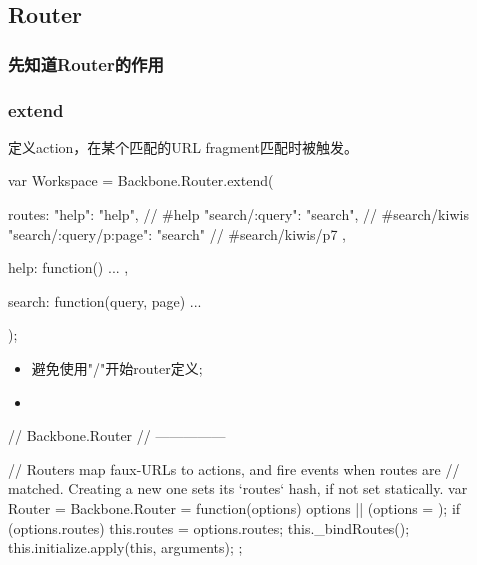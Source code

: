


\subsection{Router}

\subsubsection{先知道Router的作用}

\subsubsection{extend}

定义action，在某个匹配的URL fragment匹配时被触发。

\begin{JavaScript}
var Workspace = Backbone.Router.extend({

  routes: {
    "help":                 "help",    // #help
    "search/:query":        "search",  // #search/kiwis
    "search/:query/p:page": "search"   // #search/kiwis/p7
  },

  help: function() {
    ...
  },

  search: function(query, page) {
    ...
  }

});
\end{JavaScript}

\begin{itemize}
\item 避免使用"/"开始router定义;
\item 
\end{itemize}

\begin{JavaScript}
  // Backbone.Router
  // ---------------

  // Routers map faux-URLs to actions, and fire events when routes are
  // matched. Creating a new one sets its `routes` hash, if not set statically.
  var Router = Backbone.Router = function(options) {
    options || (options = {});
    if (options.routes) this.routes = options.routes;
    this._bindRoutes();
    this.initialize.apply(this, arguments);
  };
\end{JavaScript}


